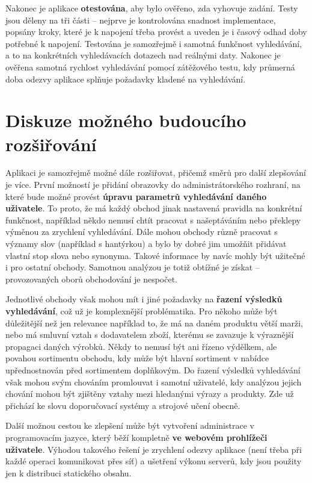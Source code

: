 \documentclass[FM,DP]{tulthesis}
\begin{document}
Nakonec je aplikace \textbf{otestována}, aby bylo ověřeno, zda vyhovuje zadání. Testy jsou děleny na tři
části -- nejprve je kontrolována snadnost implementace, popsány kroky, které je k napojení třeba 
provést a uveden je i časový odhad doby potřebné k napojení. Testována je samozřejmě i samotná
funkčnost vyhledávání, a to na konkrétních vyhledávacích dotazech nad reálnými daty. Nakonec
je ověřena samotná rychlost vyhledávání pomocí zátěžového testu, kdy průmerná doba odezvy aplikace
splňuje požadavky kladené na vyhledávání.

\section{Diskuze možného budoucího rozšiřování}

Aplikaci je samozřejmě možné dále rozšiřovat, přičemž směrů pro další zlepšování je více. První možností
je přidání obrazovky do administrátorského rozhraní, na které bude možné provést 
\textbf{úpravu parametrů vyhledávání daného uživatele}. To proto, že má každý obchod jinak nastavená pravidla 
na konkrétní funkčnost, například někdo nemusí chtít pracovat s našeptáváním nebo překlepy výměnou za zrychlení 
vyhledávání. Dále mohou obchody různě pracovat s významy slov (například s hantýrkou) a bylo by dobré jim
umožňit přidávat vlastní stop slova nebo synonyma. Takové informace by navíc mohly být užitečné
i pro ostatní obchody. Samotnou analýzou je totiž obtížné je získat -- provozovaných oborů obchodování
je nespočet.

Jednotlivé obchody však mohou mít i jiné požadavky na \textbf{řazení výsledků vyhledávání}, což už je 
komplexnější problématika. Pro někoho může být důležitější než jen relevance například to, že
má na daném produktu větší marži, nebo má smluvní vztah s dodavatelem zboží, kterému se zavazuje
k výraznější propagaci daných výrobků. Někdy to nemusí být ani řízeno výdělkem, ale povahou sortimentu
obchodu, kdy může být hlavní sortiment v nabídce upřednostnován před sortimentem doplňkovým. Do řazení
výsledků vyhledávání však mohou svým chováním promlouvat i samotní uživatelé, kdy analýzou jejich 
chování mohou být zjištěny vztahy mezi hledanými výrazy a produkty. Zde už přichází ke slovu
doporučovací systémy a strojové učení obecně.

Další možnou cestou ke zlepšení může být vytvoření administrace v programovacím jazyce, který běží kompletně
\textbf{ve webovém prohlížeči uživatele}. Výhodou takového řešení je zrychlení odezvy aplikace 
(není třeba při každé operaci komunikovat přes síť) a ušetření výkonu serverů, kdy jsou použity 
jen k distribuci statického obsahu. 
\end{document}
